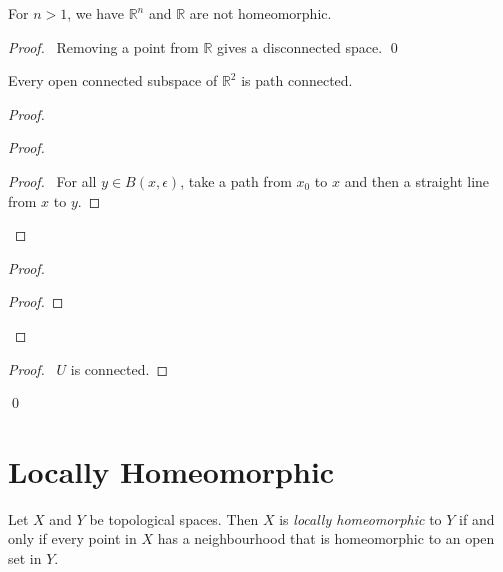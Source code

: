 \begin{cor}
For $n > 1$, we have $\mathbb{R}^n$ and $\mathbb{R}$ are not homeomorphic.
\end{cor}

\begin{proof}
\pf\ Removing a point from $\mathbb{R}$ gives a disconnected space. \qed
\end{proof}

\begin{prop}
Every open connected subspace of $\mathbb{R}^2$ is path connected.
\end{prop}

\begin{proof}
\pf
{}
\begin{proof}
	\begin{proof}
		\pf\ For all $y \in B(x,\epsilon)$, take a path from $x_0$ to $x$ and then a straight line from $x$ to $y$.
	\end{proof}
\end{proof}
\begin{proof}
	\begin{proof}
	\end{proof}
\end{proof}
\begin{proof}
	\pf\ $U$ is connected.
\end{proof}
\qed
\end{proof}

\section{Locally Homeomorphic}

\begin{df}
Let $X$ and $Y$ be topological spaces. Then $X$ is \emph{locally homeomorphic} to $Y$ if and only if every point in $X$ has a neighbourhood that is homeomorphic to an open set in $Y$.
\end{df}

